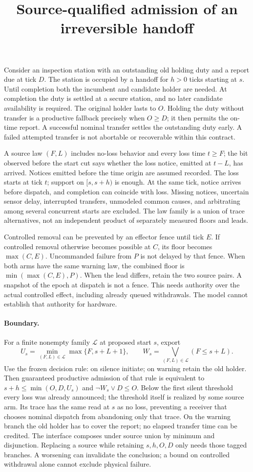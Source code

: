 \documentclass[11pt]{article}
\title{Source-qualified admission of an irreversible handoff}
\author{}
\date{}
\begin{document}
\maketitle
Consider an inspection station with an outstanding old holding duty and a
report due at tick $D$. The station is occupied by a handoff for $h>0$ ticks
starting at $s$. Until completion both the incumbent and candidate holder
are needed. At completion the duty is settled at a secure station, and no
later candidate availability is required. The original holder lasts to $O$.
Holding the duty without transfer is a productive fallback precisely when
$O\ge D$; it then permits the on-time report. A successful nominal transfer
settles the outstanding duty early. A failed attempted transfer is not
abortable or recoverable within this contract.

A source law $(F,L)$ includes no-loss behavior and every loss time $t\ge F$;
the bit observed before the start cut says whether the loss notice, emitted
at $t-L$, has arrived. Notices emitted before the time origin are assumed
recorded. The loss starts at tick $t$; support on $[s,s+h)$ is enough. At the
same tick, notice arrives before dispatch, and completion can coincide with
loss. Missing notices, uncertain sensor delay, interrupted transfers,
unmodeled common causes, and arbitrating among several concurrent starts
are excluded. The law family is a union of trace alternatives, not an
independent product of separately measured floors and leads.

Controlled removal can be prevented by an effector fence until tick $E$.
If controlled removal otherwise becomes possible at $C$, its floor becomes
$\max(C,E)$. Uncommanded failure from $P$ is not delayed by that fence.
When both arms have the same warning law, the combined floor is
$\min(\max(C,E),P)$. When the lead differs, retain the two source pairs. A
snapshot of the epoch at dispatch is not a fence. This needs authority over
the actual controlled effect, including already queued withdrawals. The
model cannot establish that authority for hardware.

\paragraph{Boundary.}
For a finite nonempty family $\mathcal L$ at proposed start $s$, export
\[
 U_s=\min_{(F,L)\in\mathcal L}\max\{F,s+L+1\},
 \qquad W_s=\bigvee_{(F,L)\in\mathcal L}(F\le s+L).
\]
Use the frozen decision rule: on silence initiate; on warning retain the
old holder. Then guaranteed productive admission of that rule is equivalent
to $s+h\le\min(O,D,U_s)$ and $\neg W_s\lor D\le O$.
Below the first silent threshold every loss was already announced; the
threshold itself is realized by some source arm. Its trace has the same
read at $s$ as no loss, preventing a receiver that chooses nominal
dispatch from abandoning only that trace. On the warning branch the old
holder has to cover the report; no elapsed transfer time can be credited.
The interface composes under source union by minimum and disjunction.
Replacing a source while retaining $s,h,O,D$ only needs those tagged
branches. A worsening can invalidate the conclusion; a bound on controlled
withdrawal alone cannot exclude physical failure.
\end{document}

